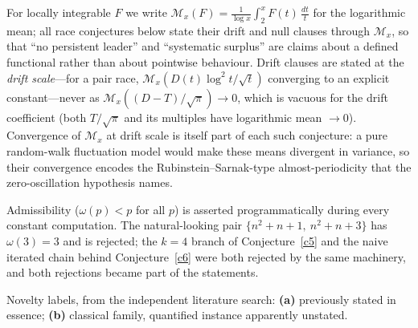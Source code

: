 \documentclass[11pt]{article}
\theoremstyle{definition}
\newcommand{\M}{\mathcal M}
\begin{document}
For locally integrable $F$ we write
$\M_x(F)=\frac1{\log x}\int_2^x F(t)\,\frac{dt}t$ for the logarithmic
mean; all race conjectures below state their drift and null clauses
through $\M_x$, so that ``no persistent leader'' and ``systematic
surplus'' are claims about a defined functional rather than about
pointwise behaviour.  Drift clauses are stated at the \emph{drift
scale}---for a pair race, $\M_x(D(t)\log^2t/\sqrt t)$ converging to
an explicit constant---never as
$\M_x((D-T)/\sqrt\pi)\to0$, which is vacuous for the drift coefficient
(both $T/\sqrt\pi$ and its multiples have logarithmic mean $\to0$).
Convergence of $\M_x$ at
drift scale is itself part of each such conjecture: a pure
random-walk fluctuation model would make these means divergent in
variance, so their convergence encodes the Rubinstein--Sarnak-type
almost-periodicity that the zero-oscillation hypothesis names.

Admissibility ($\omega(p)<p$ for all $p$) is asserted programmatically
during every constant computation.  The natural-looking pair $\{n^2+n+1,\
n^2+n+3\}$ has $\omega(3)=3$ and is
rejected; the $k=4$ branch of Conjecture~\ref{c5} and the naive
iterated chain behind Conjecture~\ref{c6} were both rejected by the
same machinery, and both rejections became part of the statements.

Novelty labels, from the independent literature search: \textbf{(a)} previously stated in essence;
\textbf{(b)} classical family, quantified instance apparently unstated.
\end{document}
